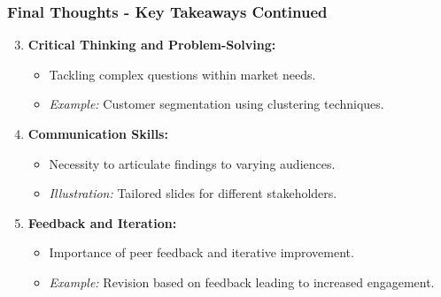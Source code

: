 \documentclass[aspectratio=169]{beamer}
\begin{document}
\begin{frame}[fragile]
    \frametitle{Final Thoughts - Key Takeaways Continued}
    \begin{enumerate}
        \setcounter{enumi}{2} %
        \item \textbf{Critical Thinking and Problem-Solving:}
            \begin{itemize}
                \item Tackling complex questions within market needs.
                \item \textit{Example:} Customer segmentation using clustering techniques.
            \end{itemize}
        \item \textbf{Communication Skills:}
            \begin{itemize}
                \item Necessity to articulate findings to varying audiences.
                \item \textit{Illustration:} Tailored slides for different stakeholders.
            \end{itemize}
        \item \textbf{Feedback and Iteration:}
            \begin{itemize}
                \item Importance of peer feedback and iterative improvement.
                \item \textit{Example:} Revision based on feedback leading to increased engagement.
            \end{itemize}
    \end{enumerate}
\end{frame}
\end{document}
